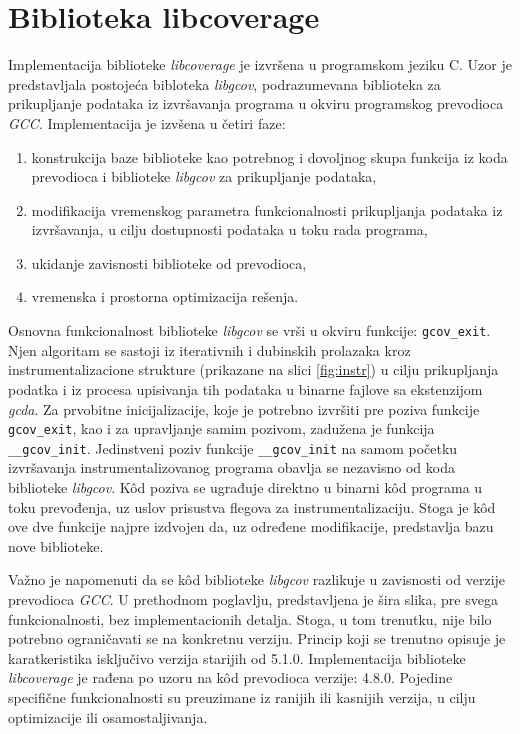 \documentclass[12pt,oneside]{memoir}
\newcommand{\kod}[1]{\texttt{#1}}
\newcommand{\strano}[1]{\textit{#1}}
\begin{document}
\section{Biblioteka libcoverage}

Implementacija biblioteke \strano{libcoverage} je izvršena u programskom jeziku C. Uzor je predstavljala postojeća bibloteka \strano{libgcov}, podrazumevana biblioteka za prikupljanje podataka iz izvršavanja programa u okviru programskog prevodioca \strano{GCC}. Implementacija je izvšena u četiri faze:
\begin{enumerate}
\item konstrukcija baze biblioteke kao potrebnog i dovoljnog skupa funkcija iz koda prevodioca i biblioteke \strano{libgcov} za prikupljanje podataka,
\item modifikacija vremenskog parametra funkcionalnosti prikupljanja podataka iz izvršavanja, u cilju dostupnosti podataka u toku rada programa,
\item ukidanje zavisnosti biblioteke od prevodioca,
\item vremenska i prostorna optimizacija rešenja.
\end{enumerate}


Osnovna funkcionalnost biblioteke \strano{libgcov} se vrši u okviru funkcije: \kod{gcov\_exit}. Njen algoritam se sastoji iz iterativnih i dubinskih prolazaka kroz instrumentalizacione strukture (prikazane na slici \ref{fig:instr}) u cilju prikupljanja podatka i iz procesa upisivanja tih podataka u binarne fajlove sa ekstenzijom \strano{gcda}. Za prvobitne inicijalizacije, koje je potrebno izvršiti pre poziva funkcije \kod{gcov\_exit}, kao i za upravljanje samim pozivom, zadužena je funkcija \kod{\_\_gcov\_init}. Jedinstveni poziv funkcije \kod{\_\_gcov\_init} na samom početku izvršavanja instrumentalizovanog programa obavlja se nezavisno od koda biblioteke \strano{libgcov}. K\^{o}d poziva se ugrađuje direktno u binarni k\^{o}d programa u toku prevođenja, uz uslov prisustva flegova za instrumentalizaciju. Stoga je k\^{o}d ove dve funkcije najpre izdvojen da, uz određene modifikacije, predstavlja bazu nove biblioteke. 

Važno je napomenuti da se k\^{o}d biblioteke \strano{libgcov} razlikuje u zavisnosti od verzije prevodioca \strano{GCC}. U prethodnom poglavlju, predstavljena je šira slika, pre svega funkcionalnosti, bez implementacionih detalja. Stoga, u tom trenutku, nije bilo potrebno ograničavati se na konkretnu verziju. Princip koji se trenutno opisuje je karatkeristika isključivo verzija starijih od 5.1.0. Implementacija biblioteke \strano{libcoverage} je rađena po uzoru na k\^{o}d prevodioca verzije: 4.8.0. Pojedine specifične funkcionalnosti su preuzimane iz ranijih ili kasnijih verzija, u cilju optimizacije ili osamostaljivanja. 
\end{document}
